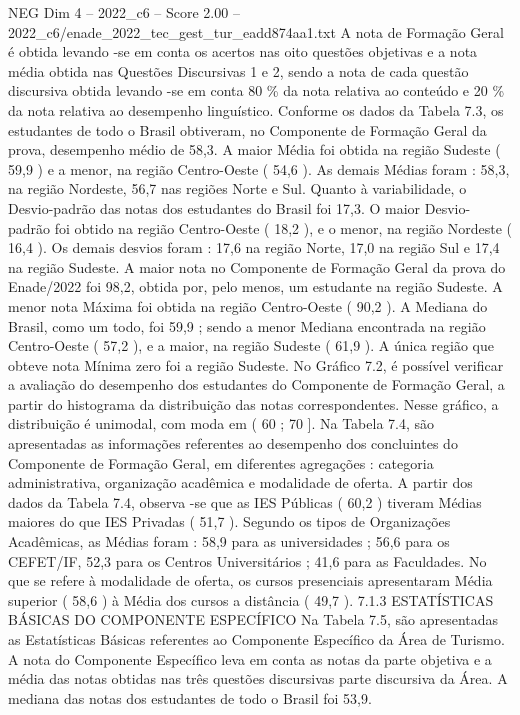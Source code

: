 \begin{textsample}{NEG Dim 4 – 2022\_c6 – Score 2.00 – 2022\_c6/enade\_2022\_tec\_gest\_tur\_eadd874aa1.txt}
A nota de Formação Geral é obtida levando -se em conta os acertos nas oito questões objetivas e a nota média obtida nas Questões Discursivas 1 e 2, sendo a nota de cada questão discursiva obtida levando -se em conta 80 \% da nota relativa ao conteúdo e 20 \% da nota relativa ao desempenho linguístico.
Conforme os dados da Tabela 7.3, os estudantes de todo o Brasil obtiveram, no Componente de Formação Geral da prova, desempenho médio de 58,3.
A maior Média foi obtida na região Sudeste ( 59,9 ) e a menor, na região Centro-Oeste ( 54,6 ).
As demais Médias foram : 58,3, na região Nordeste, 56,7 nas regiões Norte e Sul.
Quanto à variabilidade, o Desvio-padrão das notas dos estudantes do Brasil foi 17,3.
O maior Desvio-padrão foi obtido na região Centro-Oeste ( 18,2 ), e o menor, na região Nordeste ( 16,4 ).
Os demais desvios foram : 17,6 na região Norte, 17,0 na região Sul e 17,4 na região Sudeste.
A maior nota no Componente de Formação Geral da prova do Enade/2022 foi 98,2, obtida por, pelo menos, um estudante na região Sudeste.
A menor nota Máxima foi obtida na região Centro-Oeste ( 90,2 ).
A Mediana do Brasil, como um todo, foi 59,9 ; sendo a menor Mediana encontrada na região Centro-Oeste ( 57,2 ), e a maior, na região Sudeste ( 61,9 ).
A única região que obteve nota Mínima zero foi a região Sudeste.
No Gráfico 7.2, é possível verificar a avaliação do desempenho dos estudantes do Componente de Formação Geral, a partir do histograma da distribuição das notas correspondentes.
Nesse gráfico, a distribuição é unimodal, com moda em ( 60 ; 70 ].
Na Tabela 7.4, são apresentadas as informações referentes ao desempenho dos concluintes do Componente de Formação Geral, em diferentes agregações : categoria administrativa, organização acadêmica e modalidade de oferta.
A partir dos dados da Tabela 7.4, observa -se que as IES Públicas ( 60,2 ) tiveram Médias maiores do que IES Privadas ( 51,7 ).
Segundo os tipos de Organizações Acadêmicas, as Médias foram : 58,9 para as universidades ; 56,6 para os CEFET/IF, 52,3 para os Centros Universitários ; 41,6 para as Faculdades.
No que se refere à modalidade de oferta, os cursos presenciais apresentaram Média superior ( 58,6 ) à Média dos cursos a distância ( 49,7 ). 7.1.3 ESTATÍSTICAS BÁSICAS DO COMPONENTE ESPECÍFICO Na Tabela 7.5, são apresentadas as Estatísticas Básicas referentes ao Componente Específico da Área de Turismo.
A nota do Componente Específico leva em conta as notas da parte objetiva e a média das notas obtidas nas três questões discursivas parte discursiva da Área.
A mediana das notas dos estudantes de todo o Brasil foi 53,9.

\end{textsample}
